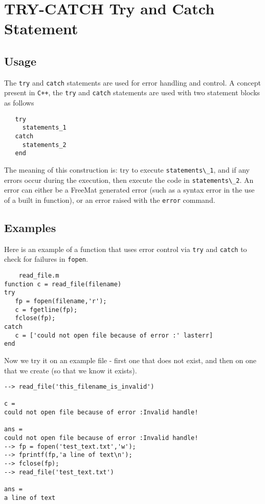 \section{TRY-CATCH Try and Catch Statement}

\subsection{Usage}

The \verb|try| and \verb|catch| statements are used for error handling
and control.  A concept present in \verb|C++|, the \verb|try| and \verb|catch|
statements are used with two statement blocks as follows
\begin{verbatim}
   try
     statements_1
   catch
     statements_2
   end
\end{verbatim}
The meaning of this construction is: try to execute \verb|statements\_1|,
and if any errors occur during the execution, then execute the
code in \verb|statements\_2|.  An error can either be a FreeMat generated
error (such as a syntax error in the use of a built in function), or
an error raised with the \verb|error| command.
\subsection{Examples}

Here is an example of a function that uses error control via \verb|try|
and \verb|catch| to check for failures in \verb|fopen|.
\begin{verbatim}
    read_file.m
function c = read_file(filename)
try
   fp = fopen(filename,'r');
   c = fgetline(fp);
   fclose(fp);
catch
   c = ['could not open file because of error :' lasterr]
end
\end{verbatim}
Now we try it on an example file - first one that does not exist,
and then on one that we create (so that we know it exists).
\begin{verbatim}
--> read_file('this_filename_is_invalid')

c = 
could not open file because of error :Invalid handle!

ans = 
could not open file because of error :Invalid handle!
--> fp = fopen('test_text.txt','w');
--> fprintf(fp,'a line of text\n');
--> fclose(fp);
--> read_file('test_text.txt')

ans = 
a line of text
\end{verbatim}
